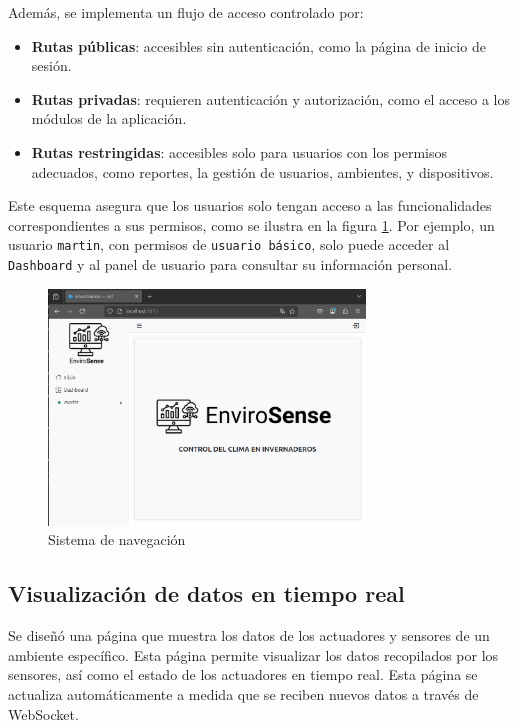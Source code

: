 Además, se implementa un flujo de acceso controlado por:

\begin{itemize}
    \item \textbf{Rutas públicas}: accesibles sin autenticación, como la página de
          inicio de sesión.
    \item \textbf{Rutas privadas}: requieren autenticación y autorización, como el
          acceso a los módulos de la aplicación.
    \item \textbf{Rutas restringidas}: accesibles solo para usuarios con los permisos
          adecuados, como reportes, la gestión de usuarios, ambientes, y dispositivos.
\end{itemize}

Este esquema asegura que los usuarios solo tengan acceso a las funcionalidades
correspondientes a sus permisos, como se ilustra en la figura
\ref{fig:navegacion}. Por ejemplo, un usuario \texttt{martin}, con permisos de
\texttt{usuario básico}, solo puede acceder al \texttt{Dashboard} y al panel de
usuario para consultar su información personal.

\begin{figure}[H]
    \centering
    \includegraphics[width=0.75\textwidth]{./Images/26_navegacion.png}
    \caption{Sistema de navegación}
    \label{fig:navegacion}
\end{figure}

\subsection{Visualización de datos en tiempo real}

Se diseñó una página que muestra los datos de los actuadores y sensores de un
ambiente específico. Esta página permite visualizar los datos recopilados por
los sensores, así como el estado de los actuadores en tiempo real. Esta página
se actualiza automáticamente a medida que se reciben nuevos datos a través de
WebSocket.

